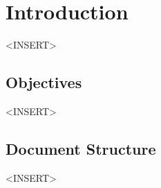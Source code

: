 \section{Introduction}

<INSERT>

\subsection{Objectives}

<INSERT>

\subsection{Document Structure}

<INSERT>
